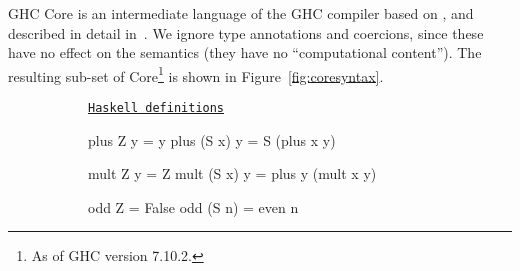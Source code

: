 GHC Core is an intermediate language of the \textsc{GHC} compiler based on
\fc{}, and described in detail in~\cite[Appendix C]{sulzmann2007system}. We
ignore type annotations and coercions, since these have no effect on the
semantics (they have no ``computational content''). The resulting sub-set of
Core\footnote{As of GHC version 7.10.2.} is shown in
Figure~\ref{fig:coresyntax}.

\begin{figure}
  \begin{subfigure}[haskell]{\textwidth}
    \underline{\texttt{Haskell definitions}}
    \begin{haskell}
plus    Z  y = y
plus (S x) y = S (plus x y)

mult    Z  y = Z
mult (S x) y = plus y (mult x y)

odd     Z  = False
odd  (S n) = even n


\end{haskell}
\end{subfigure}
\end{figure}
